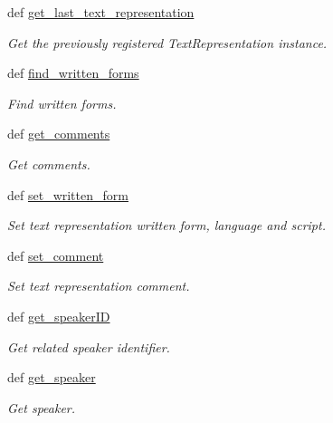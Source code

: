 \begin{DoxyCompactItemize}
def \hyperlink{classlmf_1_1src_1_1mrd_1_1context_1_1_context_a89ae6b79b719e165e5773b2035eb2ded}{get\+\_\+last\+\_\+text\+\_\+representation}
\begin{DoxyCompactList}\small\item\em Get the previously registered Text\+Representation instance. \end{DoxyCompactList}\item 
def \hyperlink{classlmf_1_1src_1_1mrd_1_1context_1_1_context_a4969405d9d78799039adce3919656fcf}{find\+\_\+written\+\_\+forms}
\begin{DoxyCompactList}\small\item\em Find written forms. \end{DoxyCompactList}\item 
def \hyperlink{classlmf_1_1src_1_1mrd_1_1context_1_1_context_a822729925a426c3ea85d6d4206c059c7}{get\+\_\+comments}
\begin{DoxyCompactList}\small\item\em Get comments. \end{DoxyCompactList}\item 
def \hyperlink{classlmf_1_1src_1_1mrd_1_1context_1_1_context_a5c25980cacb6a7268fc6144ee464ff51}{set\+\_\+written\+\_\+form}
\begin{DoxyCompactList}\small\item\em Set text representation written form, language and script. \end{DoxyCompactList}\item 
def \hyperlink{classlmf_1_1src_1_1mrd_1_1context_1_1_context_aea5b1870d2e818c89ba00055e7318395}{set\+\_\+comment}
\begin{DoxyCompactList}\small\item\em Set text representation comment. \end{DoxyCompactList}\item 
def \hyperlink{classlmf_1_1src_1_1mrd_1_1context_1_1_context_aa17fe1cc0e3bc873967f85499fed2740}{get\+\_\+speaker\+I\+D}
\begin{DoxyCompactList}\small\item\em Get related speaker identifier. \end{DoxyCompactList}\item 
def \hyperlink{classlmf_1_1src_1_1mrd_1_1context_1_1_context_a411ba47fe4581d2e3416b44fbd9ab1d9}{get\+\_\+speaker}
\begin{DoxyCompactList}\small\item\em Get speaker. \end{DoxyCompactList}\end{DoxyCompactItemize}
